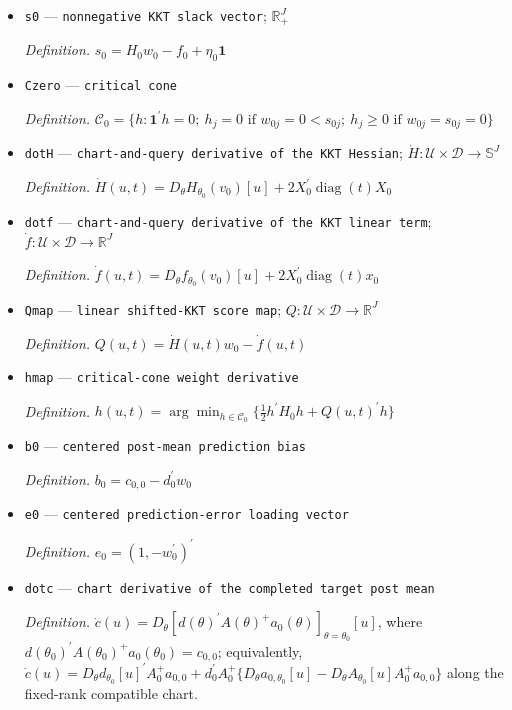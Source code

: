 \documentclass{article}
\begin{document}
\begin{itemize}
  \item \texttt{s0} --- \texttt{nonnegative KKT slack vector}; \(\mathbb R_{+}^{J}\)
  \par\smallskip\noindent\emph{Definition.} \(s_0=H_0w_0-f_0+\eta_0\mathbf 1\)
  \item \texttt{Czero} --- \texttt{critical cone}
  \par\smallskip\noindent\emph{Definition.} \(\mathcal C_0=\{h:\mathbf 1^{\prime}h=0;\ h_j=0\text{ if }w_{0j}=0<s_{0j};\ h_j\ge0\text{ if }w_{0j}=s_{0j}=0\}\)
  \item \texttt{dotH} --- \texttt{chart-\allowbreak{}and-\allowbreak{}query derivative of the KKT Hessian}; \(\dot H:\mathcal U\times\mathcal D\to\mathbb S^J\)
  \par\smallskip\noindent\emph{Definition.} \(\dot H(u,t)=D_\theta H_{\theta_0}(v_0)[u]+2X_0^{\prime}\operatorname{diag}(t)X_0\)
  \item \texttt{dotf} --- \texttt{chart-\allowbreak{}and-\allowbreak{}query derivative of the KKT linear term}; \(\dot f:\mathcal U\times\mathcal D\to\mathbb R^J\)
  \par\smallskip\noindent\emph{Definition.} \(\dot f(u,t)=D_\theta f_{\theta_0}(v_0)[u]+2X_0^{\prime}\operatorname{diag}(t)x_0\)
  \item \texttt{Qmap} --- \texttt{linear shifted-\allowbreak{}KKT score map}; \(Q:\mathcal U\times\mathcal D\to\mathbb R^J\)
  \par\smallskip\noindent\emph{Definition.} \(Q(u,t)=\dot H(u,t)w_0-\dot f(u,t)\)
  \item \texttt{hmap} --- \texttt{critical-\allowbreak{}cone weight derivative}
  \par\smallskip\noindent\emph{Definition.} \(h(u,t)=\arg\min_{h\in\mathcal C_0}\{\tfrac12h^{\prime}H_0h+Q(u,t)^{\prime}h\}\)
  \item \texttt{b0} --- \texttt{centered post-\allowbreak{}mean prediction bias}
  \par\smallskip\noindent\emph{Definition.} \(b_0=c_{0,0}-d_0^{\prime}w_0\)
  \item \texttt{e0} --- \texttt{centered prediction-\allowbreak{}error loading vector}
  \par\smallskip\noindent\emph{Definition.} \(e_0=(1,-w_0^{\prime})^{\prime}\)
  \item \texttt{dotc} --- \texttt{chart derivative of the completed target post mean}
  \par\smallskip\noindent\emph{Definition.} \(\dot c(u)=D_\theta[d(\theta)^{\prime}A(\theta)^+a_0(\theta)]_{\theta=\theta_0}[u]\), where \(d(\theta_0)^{\prime}A(\theta_0)^+a_0(\theta_0)=c_{0,0}\); equivalently, \(\dot c(u)=D_\theta d_{\theta_0}[u]^{\prime}A_0^+a_{0,0}+d_0^{\prime}A_0^+\{D_\theta a_{0,\theta_0}[u]-D_\theta A_{\theta_0}[u]A_0^+a_{0,0}\}\) along the fixed-rank compatible chart.

\end{itemize}
\end{document}
